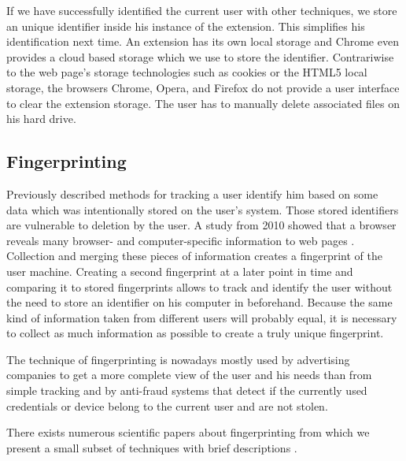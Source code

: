 	If we have successfully identified the current user with other techniques, we store an unique identifier inside his instance of the extension. This simplifies his identification next time. An extension has its own local storage and Chrome even provides a cloud based storage which we use to store the identifier. Contrariwise to the web page's storage technologies such as cookies or the HTML5 local storage, the browsers Chrome, Opera, and Firefox do not provide a user interface to clear the extension storage. The user has to manually delete associated files on his hard drive.

\subsection{Fingerprinting}

	Previously described methods for tracking a user identify him based on some data which was intentionally stored on the user's system. Those stored identifiers are vulnerable to deletion by the user. A study from 2010 showed that a browser reveals many browser- and computer-specific information to web pages \cite{Eckersley:2010:UYW:1881151.1881152}. Collection and merging these pieces of information creates a fingerprint of the user machine. Creating a second fingerprint at a later point in time and comparing it to stored fingerprints allows to track and identify the user without the need to store an identifier on his computer in beforehand. Because the same kind of information taken from different users will probably equal, it is necessary to collect as much information as possible to create a truly unique fingerprint. 
	
	The technique of fingerprinting is nowadays mostly used by advertising companies to get a more complete view of the user and his needs than from simple tracking and by anti-fraud systems that detect if the currently used credentials or device belong to the current user and are not stolen.

	There exists numerous scientific papers about fingerprinting from which we present a small subset of techniques with brief descriptions \cite{paulstone_historysniffing, MBYS11, Nikiforakis:2013:CME:2497621.2498133, Eckersley:2010:UYW:1881151.1881152, MS12, olejnik:hal-00747841}. 
	
